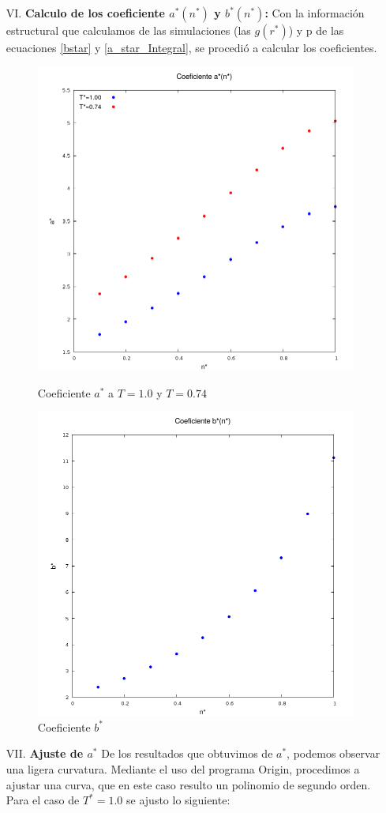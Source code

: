 \documentclass[12pt,letterpaper]{article}
\begin{document}
\begin{enumerate}
\item[VI.]\textbf{Calculo de los coeficiente $a^*(n^*)$ y $b^*(n^*)$:}
Con la información estructural que calculamos de las simulaciones (las $g(r^*)$) y p de las ecuaciones \eqref{bstar} y \eqref{a_star_Integral}, se procedió a calcular los coeficientes.
\begin{figure}[H]
	\centering
	\includegraphics[width=0.65\linewidth]{a_star.png}
	\caption{Coeficiente $a^*$ a $T=1.0$ y $T=0.74$}
	\label{Fig:A_Star}
	\includegraphics[width=0.65\linewidth]{b_star.png}
		\caption{Coeficiente $b^*$}
	\label{Fig:B_Star}
\end{figure}
 \item[VII.] \textbf{Ajuste de $a^*$ }
De los resultados que obtuvimos de $a^*$, podemos observar una ligera curvatura. Mediante el uso del programa Origin, procedimos a ajustar una curva, que en este caso resulto un polinomio de segundo orden.
Para el caso de $T^*=1.0$ se ajusto lo siguiente:
\begin{align*}

\end{align*}
\end{enumerate}
\end{document}
